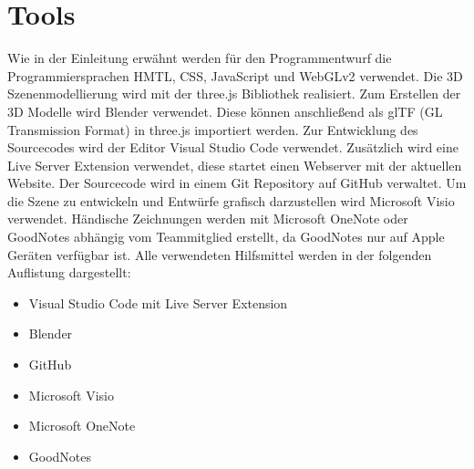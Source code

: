 \section{Tools}
Wie in der Einleitung erwähnt werden für den Programmentwurf die
Programmiersprachen HMTL, CSS, JavaScript und WebGLv2 verwendet.
Die 3D Szenenmodellierung wird mit der three.js Bibliothek realisiert.
Zum Erstellen der 3D Modelle wird Blender verwendet. Diese können anschließend als
glTF (GL Transmission Format) in three.js importiert werden.
\newparagraph
Zur Entwicklung des Sourcecodes wird der Editor Visual Studio Code verwendet.
Zusätzlich wird eine Live Server Extension verwendet, diese startet einen Webserver mit der aktuellen Website.
Der Sourcecode wird in einem Git Repository auf GitHub verwaltet.
\newparagraph
Um die Szene zu entwickeln und Entwürfe grafisch darzustellen wird Microsoft Visio verwendet.
Händische Zeichnungen werden mit Microsoft OneNote oder GoodNotes abhängig vom Teammitglied erstellt,
da GoodNotes nur auf Apple Geräten verfügbar ist.
\newparagraph
Alle verwendeten Hilfsmittel werden in der folgenden Auflistung dargestellt:
\begin{itemize}
  \item Visual Studio Code mit Live Server Extension
  \item Blender
  \item GitHub
  \item Microsoft Visio
  \item Microsoft OneNote
  \item GoodNotes
\end{itemize}

